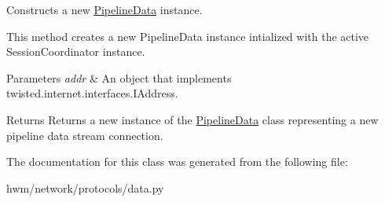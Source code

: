 Constructs a new \hyperlink{classhwm_1_1network_1_1protocols_1_1data_1_1_pipeline_data}{Pipeline\-Data} instance. 

\begin{DoxyVerb} This method creates a new PipelineData instance intialized with the active SessionCoordinator instance.
\end{DoxyVerb}



\begin{DoxyParams}{Parameters}
{\em addr} & An object that implements twisted.\-internet.\-interfaces.\-I\-Address. \\
\hline
\end{DoxyParams}
\begin{DoxyReturn}{Returns}
Returns a new instance of the \hyperlink{classhwm_1_1network_1_1protocols_1_1data_1_1_pipeline_data}{Pipeline\-Data} class representing a new pipeline data stream connection. 
\end{DoxyReturn}


The documentation for this class was generated from the following file\-:\begin{DoxyCompactItemize}
\item 
hwm/network/protocols/data.\-py\end{DoxyCompactItemize}
